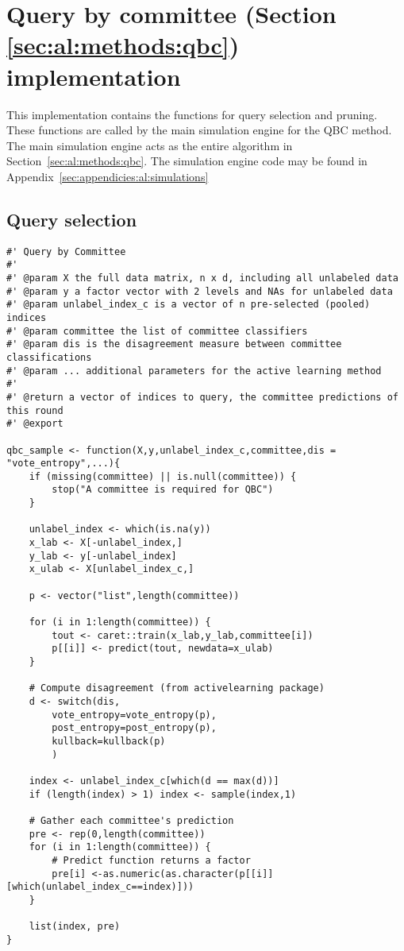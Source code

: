 \section{Query by committee (Section \ref{sec:al:methods:qbc}) implementation}
\label{sec:appendicies:al:qbc}
This implementation contains the functions for query selection and pruning. 
These functions are called by the main simulation engine for the QBC method. 
The main simulation engine acts as the entire algorithm in 
Section~\ref{sec:al:methods:qbc}. The simulation engine code may be found in 
Appendix~\ref{sec:appendicies:al:simulations}
\subsection{Query selection}
{
\begin{lstlisting}
#' Query by Committee
#'
#' @param X the full data matrix, n x d, including all unlabeled data
#' @param y a factor vector with 2 levels and NAs for unlabeled data
#' @param unlabel_index_c is a vector of n pre-selected (pooled) indices
#' @param committee the list of committee classifiers
#' @param dis is the disagreement measure between committee classifications
#' @param ... additional parameters for the active learning method
#'
#' @return a vector of indices to query, the committee predictions of this round
#' @export

qbc_sample <- function(X,y,unlabel_index_c,committee,dis = "vote_entropy",...){
	if (missing(committee) || is.null(committee)) {
		stop("A committee is required for QBC")
	}
	
	unlabel_index <- which(is.na(y))
	x_lab <- X[-unlabel_index,]
	y_lab <- y[-unlabel_index]
	x_ulab <- X[unlabel_index_c,]
	
	p <- vector("list",length(committee))
	
	for (i in 1:length(committee)) {
		tout <- caret::train(x_lab,y_lab,committee[i])
		p[[i]] <- predict(tout, newdata=x_ulab)
	}
	
	# Compute disagreement (from activelearning package)
	d <- switch(dis,
		vote_entropy=vote_entropy(p),
		post_entropy=post_entropy(p),
		kullback=kullback(p)
		)
	
	index <- unlabel_index_c[which(d == max(d))]
	if (length(index) > 1) index <- sample(index,1)
	
	# Gather each committee's prediction
	pre <- rep(0,length(committee))
	for (i in 1:length(committee)) {
		# Predict function returns a factor
		pre[i] <-as.numeric(as.character(p[[i]][which(unlabel_index_c==index)]))
	}
	
	list(index, pre)
}
\end{lstlisting}
}
